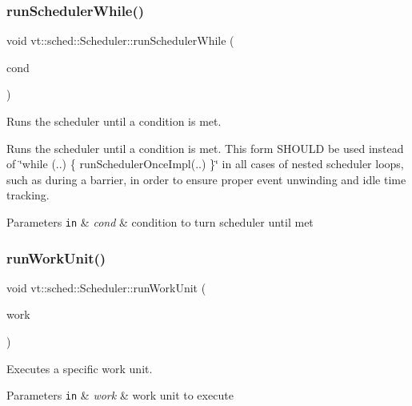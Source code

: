\subsubsection{\texorpdfstring{run\+Scheduler\+While()}{runSchedulerWhile()}}
{\footnotesize\ttfamily void vt\+::sched\+::\+Scheduler\+::run\+Scheduler\+While (\begin{DoxyParamCaption}\item[{std\+::function$<$ bool()$>$}]{cond }\end{DoxyParamCaption})}



Runs the scheduler until a condition is met. 

Runs the scheduler until a condition is met. This form S\+H\+O\+U\+LD be used instead of \char`\"{}while (..) \{ run\+Scheduler\+Once\+Impl(..) \}\char`\"{} in all cases of nested scheduler loops, such as during a barrier, in order to ensure proper event unwinding and idle time tracking.


\begin{DoxyParams}[1]{Parameters}
\mbox{\tt in}  & {\em cond} & condition to turn scheduler until met \\
\hline
\end{DoxyParams}
\mbox{\label{structvt_1_1sched_1_1_scheduler_ac4d5c3a4baf7a6cb6bdc2e8dc1a3af91}} 
\subsubsection{\texorpdfstring{run\+Work\+Unit()}{runWorkUnit()}}
{\footnotesize\ttfamily void vt\+::sched\+::\+Scheduler\+::run\+Work\+Unit (\begin{DoxyParamCaption}\item[{\hyperlink{structvt_1_1sched_1_1_scheduler_a398229f29b0940cea85aba4bae78b0be}{Unit\+Type} \&}]{work }\end{DoxyParamCaption})\hspace{0.3cm}{\ttfamily [private]}}



Executes a specific work unit. 


\begin{DoxyParams}[1]{Parameters}
\mbox{\tt in}  & {\em work} & work unit to execute \\
\hline
\end{DoxyParams}
\mbox{\label{structvt_1_1sched_1_1_scheduler_ac4221da465bbe5d3acaa56c8c099ef7b}} 
